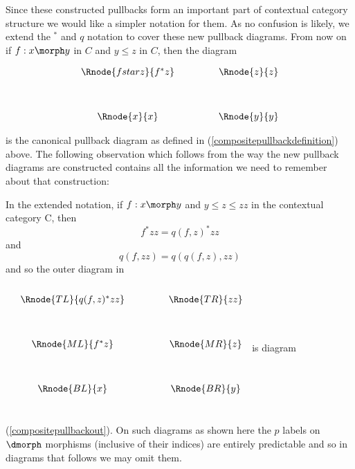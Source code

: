 Since these constructed pullbacks form an important part of contextual
category structure we would like a simpler notation for them. As no confusion is
likely, we extend the $^*$ and $q$ notation to cover these new pullback diagrams.
From now on if $f:x \morph y$ in $C$ and $y \leq z$ in $C$, then the diagram

\vspace{3mm}
\begin{center}
\begin{equation}
\label{compositepullbackout}
\begin{array}{cp{.9cm}c}
\Rnode{fstarz}{f^*z} & & \Rnode{z}{z}\\ [1.2cm]
\Rnode{x}{x}         & & \Rnode{y}{y}
\end{array}
\end{equation}
\end{center}
is the canonical pullback diagram as defined in (\ref{compositepullbackdefinition}) above. The following observation which
follows from the way the new pullback diagrams are constructed contains all the
information we need to remember about that construction:

\note
In the extended notation, if $f: x \morph y$ 
and $y \leq z \leq zz$ in the contextual category C, then
\begin{equation}
f^*zz = q(f, z)^*zz
\end{equation}
 and 
\begin{equation}
q(f, zz) = q(q(f, z), zz)
\end{equation}
and so the outer diagram in
\renewcommand{\pc}[2]{p_{#1,#2}}  %
$
\begin{array}{ccp{.9cm}c}
\\[0.25cm]
&\Rnode{TL}{q(f,z)^*zz} & & \Rnode{TR}{zz}\\ [1.2cm]
&\Rnode{ML}{f^*z} & & \Rnode{MR}{z}\\ [1.2cm]
&\Rnode{BL}{x}         & & \Rnode{BR}{y} \\[1.0cm]
\end{array}
$
is diagram (\ref{compositepullbackout}).
On such diagrams as shown here the $p$ labels on $\dmorph$ morphisms (inclusive of their indices) are entirely predictable  and so in diagrams that follows we may omit them.

